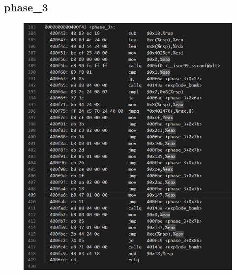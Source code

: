 \documentclass[12pt, a4paper, oneside]{ctexart}
\begin{document}
\subsection{phase\_3}
\begin{figure}
    \includegraphics[scale=0.7]{image/2.4-1.png}
\end{figure}
\end{document}
